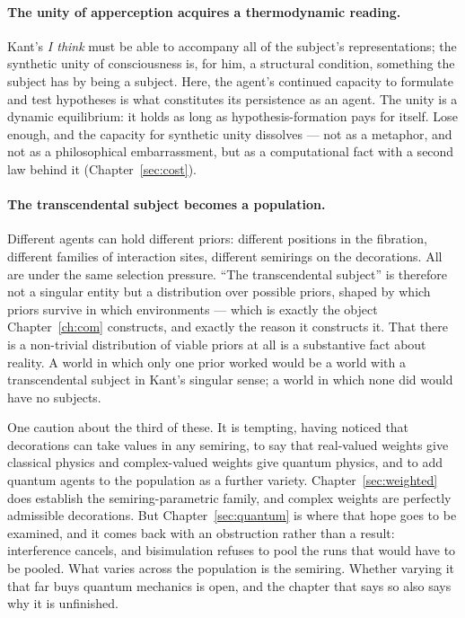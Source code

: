 \paragraph{The unity of apperception acquires a thermodynamic reading.}
Kant's \emph{I think} must be able to accompany all of the
subject's representations; the synthetic unity of consciousness is,
for him, a structural condition, something the subject has by being
a subject.
Here, the agent's continued capacity to formulate and test
hypotheses is what constitutes its persistence as an agent.
The unity is a dynamic equilibrium: it holds as long as
hypothesis-formation pays for itself.
Lose enough, and the capacity for synthetic unity dissolves --- not
as a metaphor, and not as a philosophical embarrassment, but as a
computational fact with a second law behind it
(Chapter~\ref{sec:cost}).

\paragraph{The transcendental subject becomes a population.}
Different agents can hold different priors: different positions in
the fibration, different families of interaction sites, different
semirings on the decorations.
All are under the same selection pressure.
``The transcendental subject'' is therefore not a singular entity
but a distribution over possible priors, shaped by which priors
survive in which environments --- which is exactly the object
Chapter~\ref{ch:com} constructs, and exactly the reason it
constructs it.
That there is a non-trivial distribution of viable priors at all is
a substantive fact about reality.
A world in which only one prior worked would be a world with a
transcendental subject in Kant's singular sense; a world in which
none did would have no subjects.

One caution about the third of these.
It is tempting, having noticed that decorations can take values in
any semiring, to say that real-valued weights give classical
physics and complex-valued weights give quantum physics, and to add
quantum agents to the population as a further variety.
Chapter~\ref{sec:weighted} does establish the semiring-parametric
family, and complex weights are perfectly admissible decorations.
But Chapter~\ref{sec:quantum} is where that hope goes to be
examined, and it comes back with an obstruction rather than a
result: interference cancels, and bisimulation refuses to pool the
runs that would have to be pooled.
What varies across the population is the semiring.
Whether varying it that far buys quantum mechanics is open, and the
chapter that says so also says why it is unfinished.

